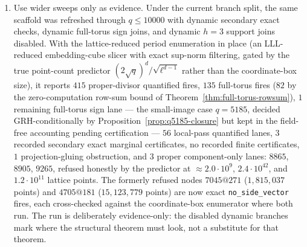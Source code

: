\documentclass[11pt]{article}
\theoremstyle{plain}
\theoremstyle{definition}
\theoremstyle{remark}
\begin{document}
\begin{enumerate}
\item Use wider sweeps only as evidence.  Under the current branch split, the
same scaffold was refreshed through $q\le10000$ with dynamic secondary exact
checks, dynamic full-torus sign joins, and dynamic $h=3$ support joins
disabled.  With the lattice-reduced period enumeration in place (an
LLL-reduced embedding-cube slicer with exact sup-norm filtering,
gated by the true point-count predictor
$(2\sqrt q)^d/\sqrt{\ell^{d-1}}$ rather than the coordinate-box size),
it reports $415$ proper-divisor quantified fires, $135$ full-torus
fires ($82$ by the zero-computation row-sum bound of
Theorem~\ref{thm:full-torus-rowsum}), $1$ remaining full-torus sign
lane --- the small-image case $q=5185$, decided GRH-conditionally by
Proposition~\ref{prop:q5185-closure} but kept in the field-free
accounting pending certification --- $56$ local-pass quantified lanes,
$3$ recorded secondary exact marginal certificates, no recorded finite
certificates, $1$ projection-gluing obstruction, and $3$ proper
component-only lanes: $8865$, $8905$, $9265$, refused honestly by the
predictor at $\approx2.0\cdot10^9$, $2.4\cdot10^{42}$, and
$1.2\cdot10^{11}$ lattice points.  The formerly refused nodes
$7045@271$ ($1{,}815{,}037$ points) and $4705@181$ ($15{,}123{,}779$
points) are now exact \texttt{no\_side\_vector} fires, each
cross-checked against the coordinate-box enumerator where both run.
The run is deliberately evidence-only: the disabled dynamic branches
mark where the structural theorem must look, not a substitute for that
theorem.
\end{enumerate}
\end{document}
